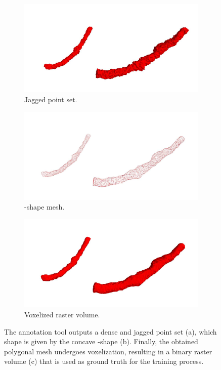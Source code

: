 \begin{figure}[t]
  \centering
  \begin{subfigure}{.45\textwidth}
    \centering
    \includegraphics[width=\textwidth]{Images/pointset.jpg}
    \caption{Jagged point set.}
    \label{fig:pointset}
  \end{subfigure}
  \begin{subfigure}{0.45\textwidth}
    \centering
    \includegraphics[width=\textwidth]{Images/alpha1.jpg}
    \caption{\textalpha-shape mesh.}
    \label{fig:alpha1}
  \end{subfigure}
  \begin{subfigure}{0.45\textwidth}
    \centering
    \includegraphics[width=\textwidth]{Images/alpha2.jpg}
    \caption{Voxelized raster volume.}
    \label{fig:alpha2}
  \end{subfigure}
  \caption{The annotation tool outputs a dense and jagged point set (a), which
  shape is given by the concave \textalpha-shape (b). Finally, the obtained
  polygonal mesh undergoes voxelization, resulting in a binary raster volume (c)
  that is used as ground truth for the training process.}
  \label{fig:preprocessing}
\end{figure}

